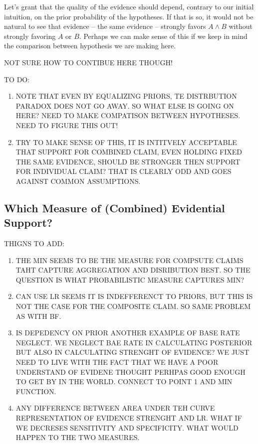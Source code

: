 \documentclass[10pt,dvipsnames,enabledeprecatedfontcommands]{scrartcl}
\begin{document}
Let's grant that the quality of the evidence should depend, contrary to
our initial intuition, on the prior probability of the hypotheses. If
that is so, it would not be natural to see that evidence -- the same
evidence -- strongly favors \(A\wedge B\) without strongly favoring
\(A\) or \(B\). Perhaps we can make sense of this if we keep in mind the
comparison between hypothesis we are making here.

NOT SURE HOW TO CONTIBUE HERE THOUGH!

TO DO:

\begin{enumerate}
\def\labelenumi{\arabic{enumi}.}
\item
  NOTE THAT EVEN BY EQUALIZING PRIORS, TE DISTRBUTION PARADOX DOES NOT
  GO AWAY. SO WHAT ELSE IS GOING ON HERE? NEED TO MAKE COMPATISON
  BETWEEN HYPOTHESES. NEED TO FIGURE THIS OUT!
\item
  TRY TO MAKE SENSE OF THIS, IT IS INTITVELY ACCEPTABLE THAT SUPPORT FOR
  COMBINED CLAIM, EVEN HOLDING FIXED THE SAME EVIDENCE, SHOULD BE
  STRONGER THEN SUPPORT FOR INDIVIDUAL CLAIM? THAT IS CLEARLY ODD AND
  GOES AGAINST COMMON ASSUMPTIONS.
\end{enumerate}

\hypertarget{which-measure-of-combined-evidential-support}{%
\subsection{Which Measure of (Combined) Evidential
Support?}\label{which-measure-of-combined-evidential-support}}

THIGNS TO ADD:

\begin{enumerate}
\def\labelenumi{\arabic{enumi}.}
\item
  THE MIN SEEMS TO BE THE MEASURE FOR COMPSUTE CLAIMS TAHT CAPTURE
  AGGREGATION AND DISRIBUTION BEST. SO THE QUESTION IS WHAT
  PROBABILISTIC MEASURE CAPTURES MIN?
\item
  CAN USE LR SEEMS IT IS INDEFFERENCT TO PRIORS, BUT THIS IS NOT THE
  CASE FOR THE COMPOSITE CLAIM. SO SAME PROBLEM AS WITH BF.
\item
  IS DEPEDENCY ON PRIOR ANOTHER EXAMPLE OF BASE RATE NEGLECT. WE NEGLECT
  BAE RATE IN CALCULATING POSTERIOR BUT ALSO IN CALCULATING STRENGHT OF
  EVIDENCE? WE JUST NEED TO LIVE WITH THE FACT THAT WE HAVE A POOR
  UNDERSTAND OF EVIDENE THOUGHT PERHPAS GOOD ENOUGH TO GET BY IN THE
  WORLD. CONNECT TO POINT 1 AND MIN FUNCTION.
\item
  ANY DIFFERENCE BETWEEN AREA UNDER TEH CURVE REPRESENTATION OF EVIDENCE
  STRENGHT AND LR. WHAT IF WE DECRESES SENSITIVITY AND SPECIFICITY. WHAT
  WOULD HAPPEN TO THE TWO MEASURES.
\end{enumerate}
\end{document}
